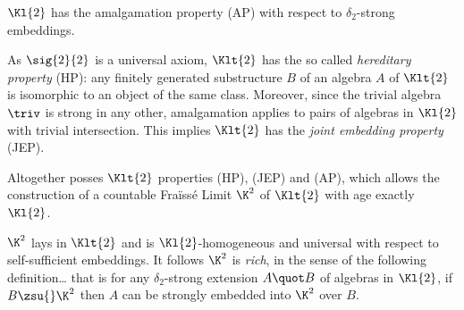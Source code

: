 \begin{cor}\label{amalgadue}
$\Kl{2}$ has the amalgamation property (AP) with respect to
$\delta_{2}$-strong embeddings.
\end{cor}
\begin{changebar}
As $\sig{2}{2}$ is a universal axiom, $\Klt{2}$ has the so called {\sl hereditary property} (HP):
any finitely generated substructure $B$ of an algebra $A$ of $\Klt{2}$ is isomorphic to
an object of the same class. Moreover, since the trivial algebra $\triv$ is strong
in any other, amalgamation applies to pairs of algebras in $\Kl{2}$ with
trivial intersection. This implies $\Klt{2}$ has the {\sl joint embedding property} (JEP).

Altogether posses $\Klt{2}$ properties (HP), (JEP) and (AP),
which allows the construction of a countable Fra\"iss\'e Limit $\K^{2}$ of $\Klt{2}$
with age exactly $\Kl{2}$.

$\K^{2}$ lays in $\Klt{2}$ and is $\Kl{2}$-homogeneous and universal with respect to
self-sufficient embeddings. It follows $\K^{2}$ is \emph{rich},
in the sense of the following definition\dots
that is for any $\delta_{2}$-strong extension $A\quot B$ of
algebras in $\Kl{2}$, if $B\zsu{}\K^{2}$ then $A$ can be
strongly embedded into $\K^{2}$ over $B$.
\end{changebar}


